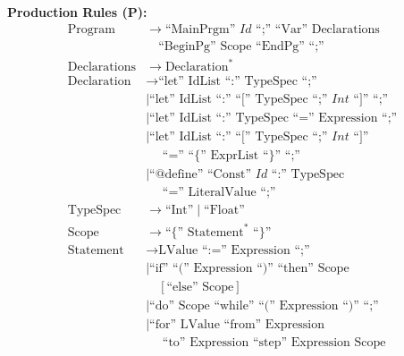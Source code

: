 \documentclass[12pt,a4paper]{article}
\begin{document}
    \vspace{5mm}
    \noindent\textbf{Production Rules (P):}
    \begin{align*}
    \text{Program} &\rightarrow \text{``MainPrgm'' } \mathit{Id} \text{ ``;'' ``Var'' } \text{Declarations} \\
                  &\quad \text{``BeginPg'' } \text{Scope} \text{ ``EndPg'' ``;''} \\
    \text{Declarations} &\rightarrow \text{Declaration}^* \\
    \text{Declaration} &\rightarrow \text{``let'' } \text{IdList} \text{ ``:'' } \text{TypeSpec} \text{ ``;''} \\
                     &\mid \text{``let'' } \text{IdList} \text{ ``:'' ``['' } \text{TypeSpec} \text{ ``;'' } \mathit{Int} \text{ ``]'' ``;''} \\
                     &\mid \text{``let'' } \text{IdList} \text{ ``:'' } \text{TypeSpec} \text{ ``='' } \text{Expression} \text{ ``;''} \\
                     &\mid \text{``let'' } \text{IdList} \text{ ``:'' ``['' } \text{TypeSpec} \text{ ``;'' } \mathit{Int} \text{ ``]''} \\
                     &\quad \text{ ``='' ``\{'' } \text{ExprList} \text{ ``\}'' ``;''} \\
                     &\mid \text{``@define'' ``Const'' } \mathit{Id} \text{ ``:'' } \text{TypeSpec} \\
                     &\quad \text{ ``='' } \text{LiteralValue} \text{ ``;''} \\
    \text{TypeSpec} &\rightarrow \text{``Int''} \mid \text{``Float''} \\
    \text{Scope} &\rightarrow \text{``\{'' } \text{Statement}^* \text{ ``\}''} \\
    \text{Statement} &\rightarrow \text{LValue} \text{ ``:='' } \text{Expression} \text{ ``;''} \\
                   &\mid \text{``if'' ``('' } \text{Expression} \text{ ``)'' ``then'' } \text{Scope} \\
                   &\quad [\text{``else'' } \text{Scope}] \\
                   &\mid \text{``do'' } \text{Scope} \text{ ``while'' ``('' } \text{Expression} \text{ ``)'' ``;''} \\
                   &\mid \text{``for'' } \text{LValue} \text{ ``from'' } \text{Expression} \\
                   &\quad \text{ ``to'' } \text{Expression} \text{ ``step'' } \text{Expression} \text{ Scope} \\

\end{align*}
\end{document}

